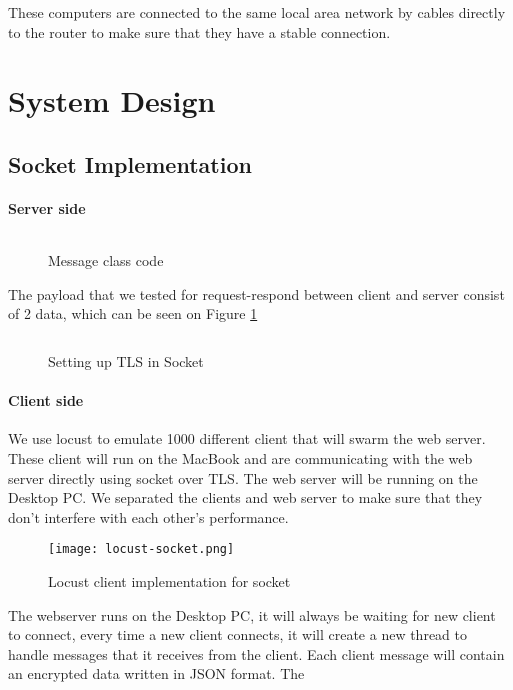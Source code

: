 These computers are connected to the same local area network by cables directly to the router to make sure that they have a stable connection.

\section{System Design}
\subsection{Socket Implementation}
\paragraph{Server side}
\begin{figure}[h]
\centering
\inputminted{kotlin}{code/message.kt}
\caption{Message class code}
\label{fig:msg-socket}
\end{figure}

The payload that we tested for request-respond between client and server consist of 2 data, which can be seen on Figure \ref{fig:msg-socket}

\begin{figure}[h]
\inputminted[firstline=26,lastline=34]{kotlin}{code/socket-main.kt}
\caption{Setting up TLS in Socket}
\label{fig:socket-tls}
\end{figure}

\paragraph{Client side}

We use locust to emulate 1000 different client that will swarm the web server. These client will run on the MacBook and are communicating with the web server directly using socket over TLS. The web server will be running on the Desktop PC. We separated the clients and web server to make sure that they don't interfere with each other's performance.

\begin{figure}[h]
\centering
\texttt{[image: locust-socket.png]}
\caption{Locust client implementation for socket}\label{fig:locust-socket}
\end{figure}

The webserver runs on the Desktop PC, it will always be waiting for new client to connect, every time a new client connects, it will create a new thread to handle messages that it receives from the client. Each client message will contain an encrypted data written in JSON format. The 

